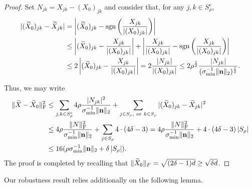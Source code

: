 \begin{proof}
  Set $N_{jk} = X_{jk} - (X_0)_{jk}$ and consider that, for any $j, k \in S_\rho^c$, %
  \begin{equation}
    \begin{aligned}
      |(\widetilde{X}_0)_{jk} - \widetilde{X}_{jk}| &= \left|(\widetilde{X}_0)_{jk} - \mathrm{sgn}\left(\frac{X_{jk}}{|(X_0)_{jk}|}\right)\right| \\ &\le \left|(\widetilde{X}_0)_{jk} - \frac{X_{jk}}{|(X_0)_{jk}|}\right| + \left|\frac{X_{jk}}{|(X_0)_{jk}|} - \mathrm{sgn}\left(\frac{X_{jk}}{|(X_0)_{jk}|}\right)\right| \\
      &\le 2\left|(\widetilde{X}_0)_{jk} - \frac{X_{jk}}{|(X_0)_{jk}|}\right| = 2\frac{|N_{jk}|}{|(X_0)_{jk}|} \le 2 \rho^{\frac{1}{2}} \frac{|N_{jk}|}{(\sigma_{\min}^{-1} \| \mathbf n \|_2)^{\frac{1}{2}}}.
    \end{aligned}
\label{eq:srho_b1}
  \end{equation}

Thus, we may write
\begin{align*}
\| \widetilde{X} - \widetilde{X}_0 \|^2_{\rm F} &\leq \sum_{j,k \in S_\rho^{c}} 4 \rho \frac{|N_{jk}|^2}{\sigma_{\min}^{-1} \| \mathbf n \|_2} + \sum_{j \in S_\rho, ~{\rm or}~ k \in S_\rho} |(\widetilde{X}_0)_{jk} - \widetilde{X}_{jk}|^2\\ &\leq 4 \rho \frac{\| N \|^2_{\rm F}}{\sigma_{\min}^{-1} \| \mathbf n \|_2} + \sum_{j \in S_\rho} 4 \cdot (4\delta - 3) = 4 \rho \frac{\| N \|^2_{\rm F}}{\sigma_{\min}^{-1} \| \mathbf n \|_2} + 4 \cdot (4\delta - 3) \left| S_\rho \right| \\ & \leq 16 (\rho \sigma_{\min}^{-1} \| \mathbf n \|_2 + \delta \left| S_\rho \right|).
\end{align*}%
The proof is completed by recalling that $\lVert \widetilde{X}_0 \rVert_F = \sqrt{(2\delta - 1)d} \ge \sqrt{\delta d}$.
\end{proof}

Our robustness result \label{thm:MainRes} relies additionally on the following lemma.

